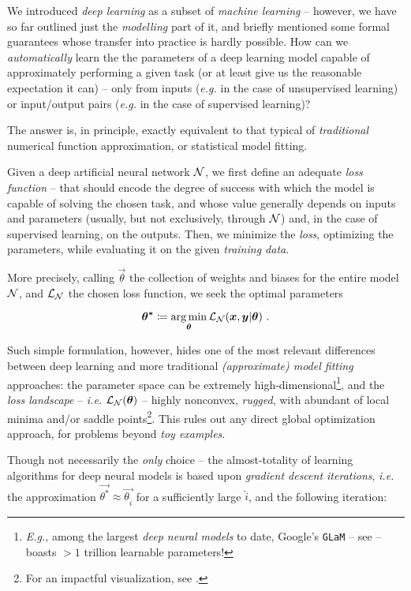We introduced \textit{deep learning} as a subset of \textit{machine learning} -- however, we have so far outlined just the \textit{modelling} part of it, and briefly mentioned some formal guarantees whose transfer into practice is hardly possible. How can we \textit{automatically} learn the the parameters of a deep learning model capable of approximately performing a given task (or at least give us the reasonable expectation it can) -- only from inputs (\textit{e.g.} in the case of unsupervised learning) or input/output pairs (\textit{e.g.} in the case of supervised learning)?

The answer is, in principle, exactly equivalent to that typical of \textit{traditional} numerical function approximation, or statistical model fitting.

Given a deep artificial neural network $\mathcal{N}$, we first define an adequate \textit{loss function} -- that should encode the degree of success with which the model is capable of solving the chosen task, and whose value generally depends on inputs and parameters (usually, but not exclusively, through $\mathcal{N}$) and, in the case of supervised learning, on the outputs. Then, we minimize the \textit{loss}, optimizing \wrt the parameters, while evaluating it on the given \textit{training data}.

More precisely, calling $\vec{\theta}$ the collection of weights and biases for the entire model $\mathcal{N}$, and $\mathcal{L}_{\mathcal{N}}$ the chosen loss function, we seek the optimal parameters

$$\bm{\theta^*} \coloneqq \operatorname*{arg\,min}_{\bm{\theta}} \mathcal{L}_{\mathcal{N}}(\bm{x}, \bm{y} | \bm{\theta}) \text{ .}$$

Such simple formulation, however, hides one of the most relevant differences between deep learning and more traditional \textit{(approximate) model fitting} approaches: the parameter space can be extremely high-dimensional\footnote{\textit{E.g.}, among the largest \textit{deep neural models} to date, Google's \texttt{GLaM} -- see \cite{DuEtAl2022GLaM} -- boasts $>1$ trillion learnable parameters!}, and the \textit{loss landscape} -- \textit{i.e.} $\mathcal{L}_{\mathcal{N}}(\bm{\theta})$ -- highly nonconvex, \textit{rugged}, with abundant of local minima and/or saddle points\footnote{For an impactful visualization, see \cite{LiEtAl2018VisualizingLL}.}. This rules out any direct global optimization approach, for problems beyond \textit{toy examples}.

Though not necessarily the \textit{only} choice -- the almost-totality of learning algorithms for deep neural models is based upon \textit{gradient descent iterations}, \textit{i.e.} the approximation $\vec{\theta^*} \approx \vec{\theta_{\hat{i}}}$ for a sufficiently large $\hat{i}$, and the following iteration:

